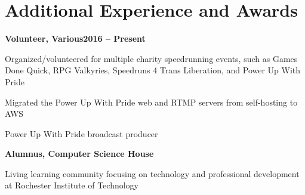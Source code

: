 \documentclass[letterpaper,10pt]{article}
\newcommand{\heading}[2]{
  \hspace{10pt}#1\hfill#2\\
}
\newcommand{\headingBf}[2]{
  \heading{\textbf{#1}}{\textbf{#2}}
}
\newenvironment{resume_list}{
  \vspace{-7pt}
  \begin{itemize}[itemsep=-2px, parsep=1pt, leftmargin=30pt]
}{
  \end{itemize}
}
\begin{document}

  \section{Additional Experience and Awards}

  \headingBf{Volunteer, Various}{2016 -- Present}
  \begin{resume_list}
    \item Organized/volunteered for multiple charity speedrunning events, such as Games Done Quick, RPG Valkyries, Speedruns 4 Trans Liberation, and Power Up With Pride
    \item Migrated the Power Up With Pride web and RTMP servers from self-hosting to AWS
    \item Power Up With Pride broadcast producer 
  \end{resume_list}

  \headingBf{Alumnus, Computer Science House}{}
  \begin{resume_list}
    \item Living learning community focusing on technology and professional development at Rochester Institute of Technology
  \end{resume_list}
\end{document}
